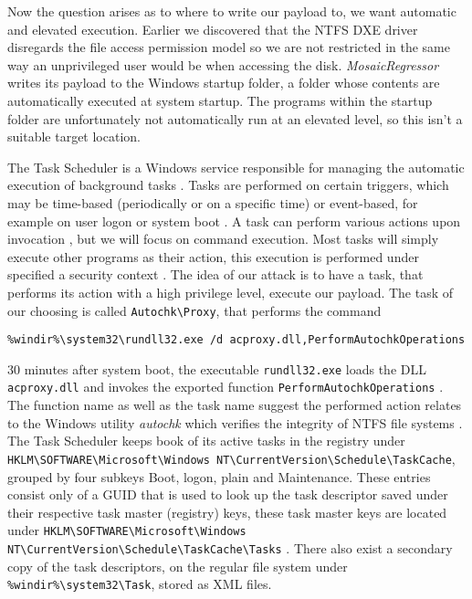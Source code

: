 Now the question arises as to where to write our payload to, we want automatic and elevated execution.
Earlier we discovered that the \ac{NTFS} \ac{DXE} driver disregards the file access permission model  so we are not restricted in the same way an unprivileged user would be when accessing the disk.
\emph{MosaicRegressor} writes its payload to the Windows startup folder, a folder whose contents are automatically executed at system startup.
The programs within the startup folder are unfortunately not automatically run at an elevated level, so this isn't a suitable target location.


The Task Scheduler is a Windows service responsible for managing the automatic execution of background tasks \cite[Section 10]{windows-internals-7-part2}.
Tasks are performed on certain triggers, which may be time-based (periodically or on a specific time) or event-based, for example on user logon or system boot \cite{microsoft-task-scheduler-triggers}.
A task can perform various actions upon invocation \cite{microsoft-task-scheduler-actions}, but we will focus on command execution.
Most tasks will simply execute other programs as their action, this execution is performed under specified a security context \cite{microsoft-task-scheduler-security-contexts}.
The idea of our attack is to have a task, that performs its action with a high privilege level, execute our payload.
The task of our choosing is called \lstinline{Autochk\Proxy}, that performs the command

\begin{lstlisting}
%windir%\system32\rundll32.exe /d acproxy.dll,PerformAutochkOperations
\end{lstlisting}

30 minutes after system boot, the executable \lstinline{rundll32.exe} loads the \ac{DLL} \lstinline{acproxy.dll} and invokes the exported function \lstinline{PerformAutochkOperations} \cite{microsoft-rundll32}.
The function name as well as the task name suggest the performed action relates to the Windows utility \emph{autochk} which verifies the integrity of \ac{NTFS} file systems \cite{microsoft-autochk}.
The Task Scheduler keeps book of its active tasks in the registry under \lstinline{HKLM\SOFTWARE\Microsoft\Windows NT\CurrentVersion\Schedule\TaskCache}, grouped by four subkeys Boot, logon, plain and Maintenance.
These entries consist only of a \ac{GUID} that is used to look up the task descriptor saved under their respective task master (registry) keys, these task master keys are located under \lstinline{HKLM\SOFTWARE\Microsoft\Windows NT\CurrentVersion\Schedule\TaskCache\Tasks} \cite[Section 10]{windows-internals-7-part2}.
There also exist a secondary copy of the task descriptors, on the regular file system under \lstinline{%windir%\system32\Task}, stored as \ac{XML} files.

